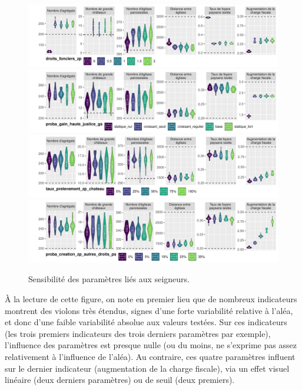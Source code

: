 \begin{figure}[H]
	\centering
	\includegraphics[width=\linewidth]{img/sensib/sensibilite_droits_fonciers_zp.pdf}
	\includegraphics[width=\linewidth]{img/sensib/sensibilite_proba_gain_haute_justice_gs.pdf}
	\includegraphics[width=\linewidth]{img/sensib/sensibilite_taux_prelevement_zp_chateau.pdf}
	\includegraphics[width=\linewidth]{img/sensib/sensibilite_proba_creation_zp_autres_droits_ps.pdf}
	\caption{Sensibilité des paramètres liés aux seigneurs.}
	\label{fig:sensib-seigneurs}
\end{figure}

À la lecture de cette figure, on note en premier lieu que de nombreux indicateurs montrent des \og violons\fg{} très étendus, signes d'une forte variabilité relative à l'aléa, et donc d'une faible variabilité absolue aux valeurs testées.
Sur ces indicateurs (les trois premiers indicateurs des trois derniers paramètres par exemple), l'influence des paramètres est presque nulle (ou du moins, ne s'exprime pas assez relativement à l'influence de l'aléa).
Au contraire, ces quatre paramètres influent sur le dernier indicateur (augmentation de la charge fiscale), via un effet visuel linéaire (deux derniers paramètres) ou de seuil (deux premiers).

